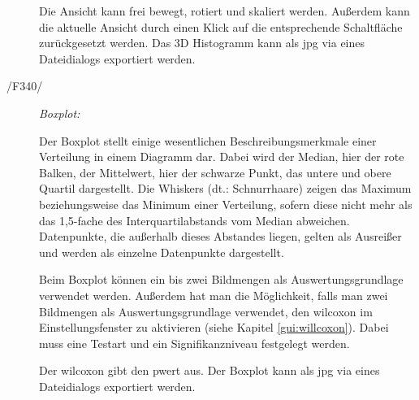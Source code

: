 \begin{description}
			Die Ansicht kann frei bewegt, rotiert und skaliert werden. Außerdem kann die aktuelle Ansicht durch einen Klick auf die entsprechende Schaltfläche zurückgesetzt werden. Das 3D Histogramm kann als \gls{jpg} via eines Dateidialogs exportiert werden.
\newpage
		\item[/F340/] \textit{Boxplot:}\par 
			\begin{figure}[H]
				\centering
			\end{figure}
			Der Boxplot stellt einige wesentlichen Beschreibungsmerkmale einer Verteilung in einem Diagramm dar. Dabei wird der Median, hier der rote Balken, der Mittelwert, hier der schwarze Punkt, das untere und obere Quartil dargestellt. Die Whiskers (dt.: Schnurrhaare) zeigen das Maximum beziehungsweise das Minimum einer Verteilung, sofern diese nicht mehr als das 1,5-fache des Interquartilabstands vom Median abweichen. Datenpunkte, die außerhalb dieses Abstandes liegen, gelten als Ausreißer und werden als einzelne Datenpunkte dargestellt.
			\par
			Beim Boxplot können ein bis zwei Bildmengen als Auswertungsgrundlage verwendet werden. Außerdem hat man die Möglichkeit, falls man zwei Bildmengen als Auswertungsgrundlage verwendet, den \gls{wilcoxon} im Einstellungsfenster zu aktivieren (siehe Kapitel \ref{gui:willcoxon}). Dabei muss eine Testart und ein Signifikanzniveau festgelegt werden.
\par Der \gls{wilcoxon} gibt den \gls{pwert} aus. Der Boxplot kann als \gls{jpg} via eines Dateidialogs exportiert werden.


\end{description}
